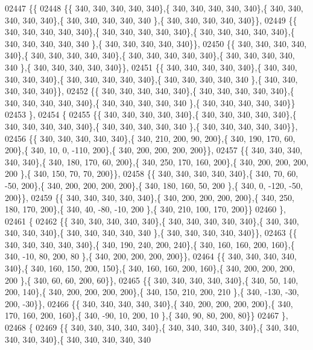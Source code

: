 \begin{DoxyCode}
02447 \{\{
02448 \{\{ 340, 340, 340, 340, 340\},\{ 340, 340, 340, 340, 340\},\{ 340, 340, 340, 340, 340\},\{ 340, 340, 340, 340, 340
      \},\{ 340, 340, 340, 340, 340\}\},
02449 \{\{ 340, 340, 340, 340, 340\},\{ 340, 340, 340, 340, 340\},\{ 340, 340, 340, 340, 340\},\{ 340, 340, 340, 340, 340
      \},\{ 340, 340, 340, 340, 340\}\},
02450 \{\{ 340, 340, 340, 340, 340\},\{ 340, 340, 340, 340, 340\},\{ 340, 340, 340, 340, 340\},\{ 340, 340, 340, 340, 340
      \},\{ 340, 340, 340, 340, 340\}\},
02451 \{\{ 340, 340, 340, 340, 340\},\{ 340, 340, 340, 340, 340\},\{ 340, 340, 340, 340, 340\},\{ 340, 340, 340, 340, 340
      \},\{ 340, 340, 340, 340, 340\}\},
02452 \{\{ 340, 340, 340, 340, 340\},\{ 340, 340, 340, 340, 340\},\{ 340, 340, 340, 340, 340\},\{ 340, 340, 340, 340, 340
      \},\{ 340, 340, 340, 340, 340\}\}
02453 \},
02454 \{
02455 \{\{ 340, 340, 340, 340, 340\},\{ 340, 340, 340, 340, 340\},\{ 340, 340, 340, 340, 340\},\{ 340, 340, 340, 340, 340
      \},\{ 340, 340, 340, 340, 340\}\},
02456 \{\{ 340, 340, 340, 340, 340\},\{ 340, 210, 200,  90, 200\},\{ 340, 190, 170,  60, 200\},\{ 340,  10,   0, -110, 
      200\},\{ 340, 200, 200, 200, 200\}\},
02457 \{\{ 340, 340, 340, 340, 340\},\{ 340, 180, 170,  60, 200\},\{ 340, 250, 170, 160, 200\},\{ 340, 200, 200, 200, 200
      \},\{ 340, 150,  70,  70, 200\}\},
02458 \{\{ 340, 340, 340, 340, 340\},\{ 340,  70,  60, -50, 200\},\{ 340, 200, 200, 200, 200\},\{ 340, 180, 160,  50, 200
      \},\{ 340,   0, -120, -50, 200\}\},
02459 \{\{ 340, 340, 340, 340, 340\},\{ 340, 200, 200, 200, 200\},\{ 340, 250, 180, 170, 200\},\{ 340,  40, -80, -10, 200
      \},\{ 340, 210, 100, 170, 200\}\}
02460 \},
02461 \{
02462 \{\{ 340, 340, 340, 340, 340\},\{ 340, 340, 340, 340, 340\},\{ 340, 340, 340, 340, 340\},\{ 340, 340, 340, 340, 340
      \},\{ 340, 340, 340, 340, 340\}\},
02463 \{\{ 340, 340, 340, 340, 340\},\{ 340, 190, 240, 200, 240\},\{ 340, 160, 160, 200, 160\},\{ 340, -10,  80, 200,  80
      \},\{ 340, 200, 200, 200, 200\}\},
02464 \{\{ 340, 340, 340, 340, 340\},\{ 340, 160, 150, 200, 150\},\{ 340, 160, 160, 200, 160\},\{ 340, 200, 200, 200, 200
      \},\{ 340,  60,  60, 200,  60\}\},
02465 \{\{ 340, 340, 340, 340, 340\},\{ 340,  50, 140, 200, 140\},\{ 340, 200, 200, 200, 200\},\{ 340, 150, 210, 200, 210
      \},\{ 340, -130, -30, 200, -30\}\},
02466 \{\{ 340, 340, 340, 340, 340\},\{ 340, 200, 200, 200, 200\},\{ 340, 170, 160, 200, 160\},\{ 340, -90,  10, 200,  10
      \},\{ 340,  90,  80, 200,  80\}\}
02467 \},
02468 \{
02469 \{\{ 340, 340, 340, 340, 340\},\{ 340, 340, 340, 340, 340\},\{ 340, 340, 340, 340, 340\},\{ 340, 340, 340, 340, 340

\end{DoxyCode}
